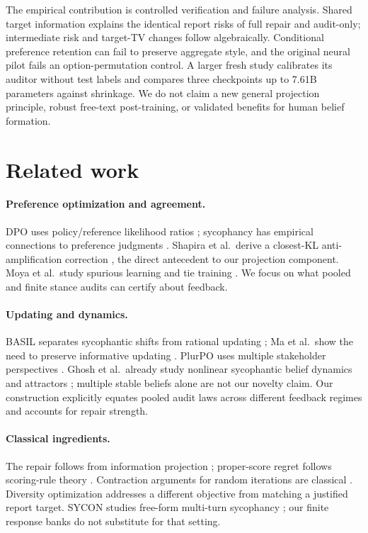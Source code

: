 \documentclass{article}
\newcommand{\citep}{\cite}
\begin{document}
The empirical contribution is controlled verification and failure analysis.
Shared target information explains the identical report risks of full
repair and audit-only; intermediate risk and target-TV changes follow
algebraically. Conditional preference retention can fail to preserve
aggregate style, and the original neural pilot fails an option-permutation
control. A larger fresh study calibrates its auditor without test labels
and compares three checkpoints up to 7.61B parameters against shrinkage. We do not claim a new general projection principle, robust
free-text post-training, or validated benefits for human belief formation.

\section{Related work}
\paragraph{Preference optimization and agreement.}
DPO uses policy/reference likelihood ratios \citep{rafailov2023}; sycophancy
has empirical connections to preference judgments \citep{sharma2024}.
Shapira et al.\ derive a closest-KL anti-amplification correction
\citep{shapira2026}, the direct antecedent to our projection component.
Moya et al.\ study spurious learning and tie training \citep{moya2026}.
We focus on what pooled and finite stance audits can certify about feedback.

\paragraph{Updating and dynamics.}
BASIL separates sycophantic shifts from rational updating \citep{atwell2026};
Ma et al.\ show the need to preserve informative updating \citep{ma2026}.
PlurPO uses multiple stakeholder perspectives \citep{hatgis2026}.
Ghosh et al.\ already study nonlinear sycophantic belief dynamics and
attractors \citep{ghosh2026}; multiple stable beliefs alone are not our
novelty claim. Our construction explicitly equates pooled audit laws
across different feedback regimes and accounts for repair strength.

\paragraph{Classical ingredients.}
The repair follows from information projection \citep{csiszar1975};
proper-score regret follows scoring-rule theory \citep{gneiting2007}.
Contraction arguments for random iterations are classical
\citep{diaconis1999}. Diversity optimization \citep{lanchantin2025} addresses
a different objective from matching a justified report target.
SYCON studies free-form multi-turn sycophancy \citep{hong2025}; our finite
response banks do not substitute for that setting.
\end{document}

